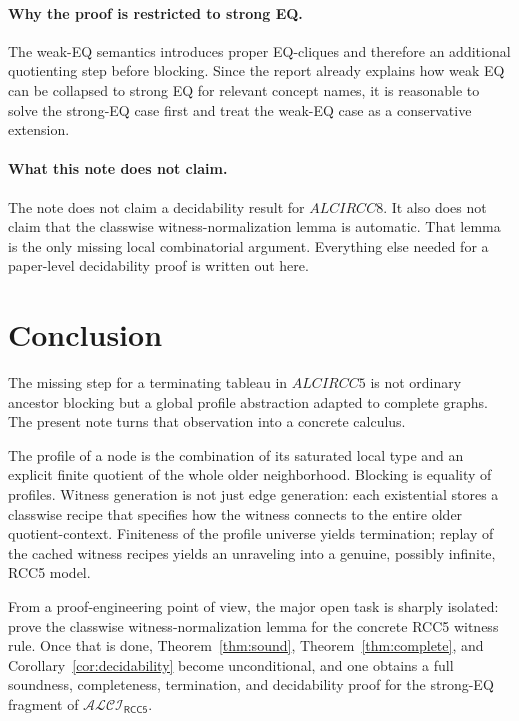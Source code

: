 \documentclass[11pt]{article}
\theoremstyle{definition}
\newcommand{\ALCIRCCFive}{\mathcal{ALCI}_{\mathsf{RCC5}}}
\begin{document}
\paragraph{Why the proof is restricted to strong EQ.}
The weak-EQ semantics introduces proper EQ-cliques and therefore an additional quotienting step before blocking. Since the report already explains how weak EQ can be collapsed to strong EQ for relevant concept names, it is reasonable to solve the strong-EQ case first and treat the weak-EQ case as a conservative extension.

\paragraph{What this note does not claim.}
The note does not claim a decidability result for $ALCIRCC8$. It also does not claim that the classwise witness-normalization lemma is automatic. That lemma is the only missing local combinatorial argument. Everything else needed for a paper-level decidability proof is written out here.

\section{Conclusion}

The missing step for a terminating tableau in $ALCIRCC5$ is not ordinary ancestor blocking but a global profile abstraction adapted to complete graphs. The present note turns that observation into a concrete calculus.

The profile of a node is the combination of its saturated local type and an explicit finite quotient of the whole older neighborhood. Blocking is equality of profiles. Witness generation is not just edge generation: each existential stores a classwise recipe that specifies how the witness connects to the entire older quotient-context. Finiteness of the profile universe yields termination; replay of the cached witness recipes yields an unraveling into a genuine, possibly infinite, RCC5 model.

From a proof-engineering point of view, the major open task is sharply isolated: prove the classwise witness-normalization lemma for the concrete RCC5 witness rule. Once that is done, Theorem~\ref{thm:sound}, Theorem~\ref{thm:complete}, and Corollary~\ref{cor:decidability} become unconditional, and one obtains a full soundness, completeness, termination, and decidability proof for the strong-EQ fragment of $\ALCIRCCFive$.
\end{document}
